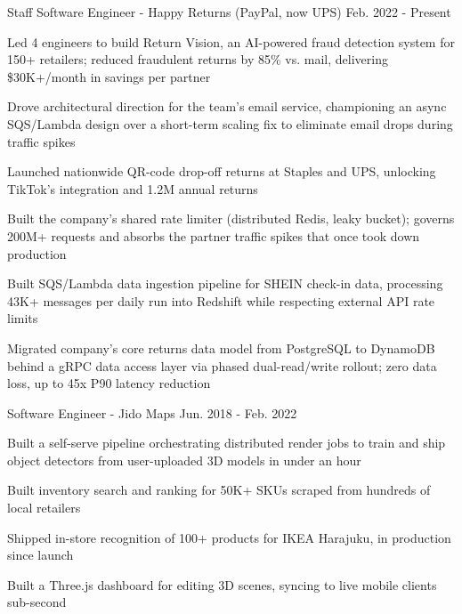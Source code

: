 \begin{cventries}
    \cventryp
        {}
        {Staff Software Engineer - Happy Returns (PayPal, now UPS)}
        {Feb. 2022 - Present}
        {}
        {
          \begin{cvitems}
            \item {Led 4 engineers to build Return Vision, an AI-powered fraud detection system for 150+ retailers; reduced fraudulent returns by 85\% vs. mail, delivering \$30K+/month in savings per partner}
            \vspace{1mm}
            \item {Drove architectural direction for the team's email service, championing an async SQS/Lambda design over a short-term scaling fix to eliminate email drops during traffic spikes}
            \vspace{1mm}
            \item {Launched nationwide QR-code drop-off returns at Staples and UPS, unlocking TikTok's integration and 1.2M annual returns}
            \vspace{1mm}
            \item {Built the company's shared rate limiter (distributed Redis, leaky bucket); governs 200M+ requests and absorbs the partner traffic spikes that once took down production}
          \vspace{1mm}
          \item {Built SQS/Lambda data ingestion pipeline for SHEIN check-in data, processing 43K+ messages per daily run into Redshift while respecting external API rate limits}
          \vspace{1mm}
          \item {Migrated company's core returns data model from PostgreSQL to DynamoDB behind a gRPC data access layer via phased dual-read/write rollout; zero data loss, up to 45x P90 latency reduction}
          \end{cvitems}
        }
    
    \vspace{4mm}
    \cventryp
        {}
        {Software Engineer - Jido Maps}
        {Jun. 2018 - Feb. 2022}
        {}
        {
          \begin{cvitems}
          \item {Built a self-serve pipeline orchestrating distributed render jobs to train and ship object detectors from user-uploaded 3D models in under an hour}
          \vspace{1mm}
          \item {Built inventory search and ranking for 50K+ SKUs scraped from hundreds of local retailers}
          \vspace{1mm}
          \item {Shipped in-store recognition of 100+ products for IKEA Harajuku, in production since launch}
          \vspace{1mm}
          \item {Built a Three.js dashboard for editing 3D scenes, syncing to live mobile clients sub-second}
          \end{cvitems}
        }
    

\end{cventries}
